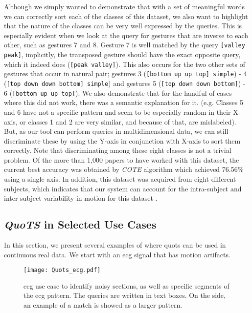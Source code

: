 Although we simply wanted to demonstrate that with a set of meaningful words we can correctly sort each of the classes of this dataset, we also want to highlight that the nature of the classes can be very well expressed by the queries. This is especially evident when we look at the query for gestures that are inverse to each other, such as gestures 7 and 8. Gesture 7 is well matched by the query \texttt{[valley peak]}, implicitly, the transposed gesture should have the exact opposite query, which it indeed does (\texttt{[peak valley]}). This also occurs for the two other sets of gestures that occur in natural pair; gestures 3 (\texttt{[bottom up up top] simple}) - 4 (\texttt{[top down down bottom] simple}) and gestures  5 (\texttt{[top down down bottom]}) - 6 (\texttt{[bottom up up top]}).
We also demonstrate that for the handful of cases where this did not work, there was a semantic explanation for it. (e.g. Classes 5 and 6 have not a specific pattern and seem to be especially random in their X-axis, or classes 1 and 2 are very similar, and because of that, are mislabeled). But, as our tool can perform queries in multidimensional data, we can still discriminate these by using the Y-axis in conjunction with X-axis to sort them correctly. 
Note that discriminating among these eight classes is not a trivial problem. Of the more than 1,000 papers to have worked with this dataset, the current best accuracy was obtained by \textit{COTE} algorithm which achieved 76.56\% using a single axis. In addition, this dataset was acquired from eight different subjects, which indicates that our system can account for the intra-subject and inter-subject variability in motion for this dataset \cite{uWave}.

\subsection{\textit{QuoTS} in Selected Use Cases}

In this section, we present several examples of where \gls{quots} can be used in continuous real data. We start with an \gls{ecg} signal that has motion artifacts.

\begin{figure}
\texttt{[image: Quots\_ecg.pdf]}
\caption{\gls{ecg} use case to identify noisy sections, as well as specific segments of the \gls{ecg} pattern. The queries are written in text boxes. On the side, an example of a match is showed as a larger pattern.}
\label{fig:use_case1}
\end{figure}

